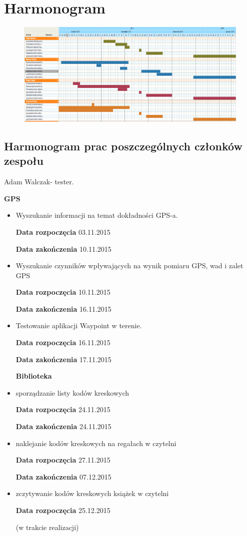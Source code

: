\section{Harmonogram}
\begin{figure}[H]
\centering
\includegraphics[scale=0.5219 , angle=90,]{czlonkowie/1/wykresGantta.png}

\end{figure}




\subsection{Harmonogram prac poszczególnych członków zespołu}

 Adam Walczak- tester. \newline
 
\textbf{GPS}
\begin{itemize}
\item Wyszukanie informacji na temat dokładności GPS-a.

\textbf{Data rozpoczęcia} 03.11.2015

\textbf{Data zakończenia} 10.11.2015
\item Wyszukanie czynników wpływających na wynik pomiaru GPS, wad i zalet GPS

\textbf{Data rozpoczęcia} 10.11.2015

\textbf{Data zakończenia} 16.11.2015
\item Testowanie aplikacji Waypoint w terenie.

\textbf{Data rozpoczęcia} 16.11.2015

\textbf{Data zakończenia} 17.11.2015
 \newline

\textbf{Biblioteka}
\item sporządzanie listy kodów kreskowych

\textbf{Data rozpoczęcia} 24.11.2015

\textbf{Data zakończenia} 24.11.2015

\item naklejanie kodów kreskowych na regałach  w czytelni

\textbf{Data rozpoczęcia} 27.11.2015

\textbf{Data zakończenia} 07.12.2015

\item zczytywanie kodów kreskowych książek w czytelni

\textbf{Data rozpoczęcia} 25.12.2015 

(w trakcie realizacji)

\end{itemize}

